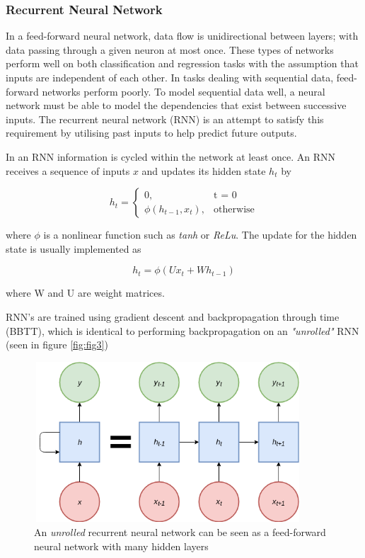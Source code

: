 \subsubsection{Recurrent Neural Network}
In a feed-forward neural network, data flow is unidirectional between layers; with data passing through a given neuron at most once. These types of networks perform well on both classification and regression tasks with the assumption that inputs are independent of each other. In tasks dealing with sequential data, feed-forward networks perform poorly. To model sequential data well, a neural network must be able to model the dependencies that exist between successive inputs. The recurrent neural network (RNN) is an attempt to satisfy this requirement by utilising past inputs to help predict future outputs.
\par
\noindent
\newline
In an RNN information is cycled within the network at least once.  An RNN receives a sequence of inputs \(x\) and updates its hidden state \(h_{t}\) by 

\begin{equation}
	h_{t}=
	\begin{cases}
	 0, & \text{t = 0} \\
	 \phi{(h_{t-1}, x_{t})}, & \text{otherwise}
	\end{cases}
\end{equation}

\noindent
where $\phi$ is a nonlinear function such as \textit{tanh} or \textit{ReLu}. The update for the hidden state is usually implemented as 

\begin{equation}
h_{t} = \phi{(Ux_{t} + Wh_{t-1})}
\end{equation}

\noindent
where W and U are weight matrices.

\par
\noindent
\newline
RNN's are trained using gradient descent and backpropagation through time (BBTT), which is identical to performing backpropagation on an \textit{"unrolled"} RNN (seen in figure \autoref{fig:fig3})

\begin{figure}[h]
	\includegraphics[width=10cm, height=6cm]{./figures/fig3}
	\centering
	\caption{An \textit{unrolled} recurrent neural network can be seen as a feed-forward neural network with many hidden layers}
	\label{fig:fig3}
\end{figure}

